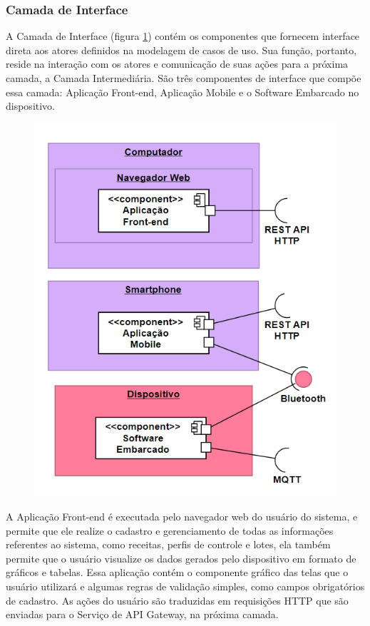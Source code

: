 \subsubsection{Camada de Interface}
A Camada de Interface (figura \ref{fig:camada_interface}) contém os componentes que fornecem interface direta aos atores definidos na modelagem de casos de uso. Sua função, portanto, reside na interação com os atores e comunicação de suas ações para a próxima camada, a Camada Intermediária. São três componentes de interface que compõe essa camada: Aplicação Front-end, Aplicação Mobile e o Software Embarcado no dispositivo. 

\begin{figure}[H]
    \centering
    \includegraphics[scale=0.50]{figuras/projeto/software/camada_interface.PNG}
    \label{fig:camada_interface}
\end{figure}

A Aplicação Front-end é executada pelo navegador web do usuário do sistema, e permite que ele realize o cadastro e gerenciamento de todas as informações referentes ao sistema, como receitas, perfis de controle e lotes, ela também permite que o usuário visualize os dados gerados pelo dispositivo em formato de gráficos e tabelas. Essa aplicação contém o componente gráfico das telas que o usuário utilizará e algumas regras de validação simples, como campos obrigatórios de cadastro. As ações do usuário são traduzidas em requisições HTTP que são enviadas para o Serviço de API Gateway, na próxima camada. 

